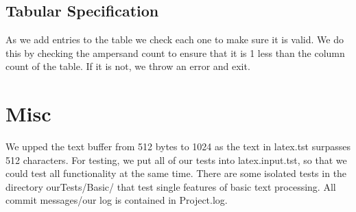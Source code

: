 \subsection{Tabular Specification}
As we add entries to the table we check each one to make sure it is valid. We do this by
checking the ampersand count to ensure that it is 1 less than the column count of the
table. If it is not, we throw an error and exit.

\section{Misc}
We upped the text buffer from 512 bytes to 1024 as the text in latex.tst surpasses 512
characters. For testing, we put all of our tests into latex.input.tst, so that we could test all functionality at the same time. There are some isolated tests in the directory ourTests/Basic/ that test single features of basic text processing. All commit messages/our log is contained in Project.log.


